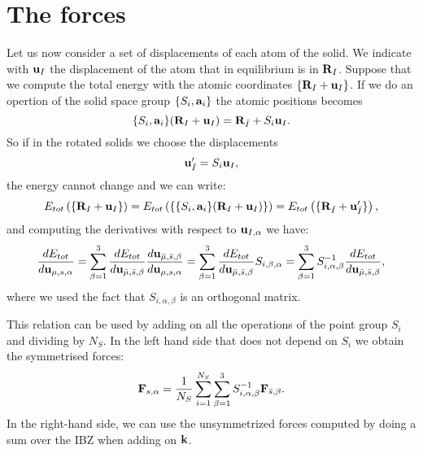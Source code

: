 \documentclass[12pt,a4paper,twoside]{report}
\begin{document}
\section{The forces}

Let us now consider a set of displacements of each atom of the solid. We indicate with ${\bf u}_{I}$ the displacement of the atom that in equilibrium is in
${\bf R}_I$. Suppose that we compute the total energy
with the atomic coordinates $\{{\bf R}_I + {\bf u}_I\}$.
If we do an opertion of the solid space group
$\{S_i,{\bf a}_i\}$ the atomic positions becomes
\begin{equation}
\{S_i,{\bf a}_i\} ({\bf R}_I + {\bf u}_I) = 
{\bf R}_{\bar I} + S_i {\bf u}_I.
\end{equation}
So if in the rotated solids we choose the displacements
\begin{equation}
{\bf u}'_{\bar I} =  S_i {\bf u}_I,
\label{rotated_disp}
\end{equation}
the energy cannot change and we can write:
\begin{equation}
E_{tot}\left(\{{\bf R}_I + {\bf u}_I\}\right) = E_{tot}\left (\{\{S_i,{\bf a}_i\} ({\bf R}_I + {\bf u}_I)\}\right )=
E_{tot}\left(\{ {\bf R}_{\bar I} + {\bf u}'_{\bar I}\}\right),
\end{equation}
and computing the derivatives with respect to ${\bf u}_{I,\alpha}$ we have:
\begin{equation}
{d E_{tot} \over d {\bf u}_{\mu,s,\alpha}} = \sum_{\beta=1}^3
{d E_{tot} \over d {\bf u}_{{\bar \mu},{\bar s},\beta}} 
{d {\bf u}_{{\bar \mu},{\bar s},\beta} \over
d {\bf u}_{\mu, s,\alpha}}=\sum_{\beta=1}^3
{d E_{tot} \over d {\bf u}_{{\bar \mu},{\bar s},\beta}} 
S_{i,\beta,\alpha}=\sum_{\beta=1}^3 S^{-1}_{i,\alpha,\beta}
{d E_{tot} \over d {\bf u}_{{\bar \mu},{\bar s},\beta}},
\end{equation}
where we used the fact that $S_{i,\alpha,\beta}$ is an orthogonal matrix.

This relation can be used by adding on all the operations of the point group $S_i$ and dividing by
$N_S$. In the left hand side that does not depend on
$S_i$ we obtain the symmetrised forces:
\begin{equation}
{\bf F}_{s,\alpha} ={1 \over N_S} \sum_{i=1}^{N_S} \sum_{\beta=1}^3 S^{-1}_{i,\alpha,\beta}
{\bf F}_{\bar s,\beta}.
\label{symforce}
\end{equation}
In the right-hand side, we can use the unsymmetrized
forces computed by doing a sum over the IBZ when
adding on ${\bf k}$.
\end{document}
